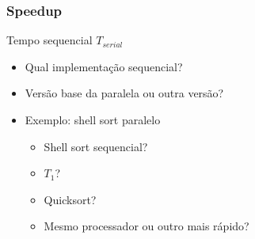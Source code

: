 \documentclass[xcolor={usenames,dvipsnames},12pt,presentation,aspectratio=169]{beamer}
\begin{document}
\begin{frame}[fragile]
  \frametitle{Speedup}
  \begin{block}{Tempo sequencial $T_{serial}$}
    \begin{itemize}
      \item Qual implementação sequencial?
      \item Versão base da paralela ou outra versão?
    \end{itemize}
  \end{block}
\begin{itemize}
  \item Exemplo: shell sort paralelo
  \begin{itemize}
    \item Shell sort sequencial?
    \item $T_1$?
    \item Quicksort?
    \item Mesmo processador ou outro mais rápido?
  \end{itemize}
\end{itemize}
\end{frame}
\end{document}
